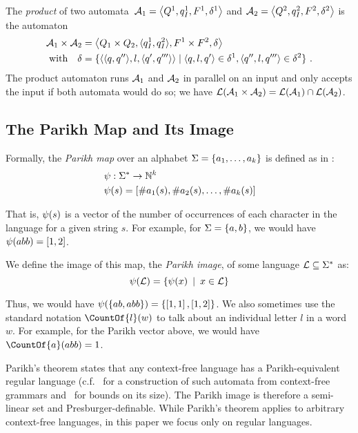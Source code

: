 The \emph{product} of two
automata~$\mathcal{A}_1 = \left\langle Q^1, q_I^1,
  F^1, \delta^1\right\rangle$ and
$\mathcal{A}_2 = \left\langle Q^2, q_I^2,
  F^2, \delta^2\right\rangle$ is the automaton
\begin{align*}
\mathcal{A}_1 \times \mathcal{A}_2 &=
\left\langle Q_1 \times Q_2, \langle q_I^1, q_I^2\rangle,
F^1 \times F^2,
  \delta\right\rangle\\
  \text{with}\quad \delta &= \{\langle\langle q,q''\rangle, l, \langle q',q'''\rangle\rangle \mid \langle q, l, q'\rangle \in \delta^1, \langle q'', l, q'''\rangle \in \delta^2\}~.
\end{align*}
The product automaton runs $\mathcal{A}_1$ and $\mathcal{A}_2$ in
parallel on an input and only accepts the input if both automata would
do so; we have $\operatorname{\mathcal{L}}(\mathcal{A}_1 \times \mathcal{A}_2) =
\operatorname{\mathcal{L}}(\mathcal{A}_1) \cap \operatorname{\mathcal{L}}(\mathcal{A}_2)$.

\subsection{The Parikh Map and Its Image}
Formally, the \textit{Parikh map} over an alphabet $\Sigma=
\left\{a_1, \ldots, a_k \right\}$ is defined as in \cite{kozen}:
$$
\begin{aligned}
& \operatorname{\psi}: \Sigma^* \rightarrow \mathbb{N}^k \\
& \operatorname{\psi}(s) = \left[{\#a_1(s), \#a_2(s), \ldots, \#a_k(s)}\right]
\end{aligned}
$$

That is, $\operatorname{\psi}(s)$ is a vector of the number of occurrences of each
character in the language for a given string $s$. For example, for  $\Sigma =
\left\{a, b\right\}$, we would have $\operatorname{\psi}(abb) = \left[{1, 2}\right]$.

We define the image of this map, the \textit{Parikh image}, of some
language $\operatorname{\mathcal{L}} \subseteq \Sigma^*$ as:
\[
\operatorname{\psi}(\operatorname{\mathcal{L}}) = \left\{\operatorname{\psi}(x) \:\mid\: x \in \operatorname{\mathcal{L}}\right\}
\]

Thus, we would have $\operatorname{\psi}(\left\{ab, abb\right\}) = \left\{\left[1,
1\right], \left[1, 2\right]\right\}$. We also sometimes use the standard
notation $\CountOf{l}(w)$ to talk about an individual letter $l$ in a word $w$. For
example, for the Parikh vector above, we would have $\CountOf{a}(abb) = 1$.

Parikh's theorem states that any context-free language has a Parikh-equivalent
regular language (c.f.~\cite{construction} for a construction of such automata
from context-free grammars and~\cite{bounds} for bounds on its size).
The Parikh image is therefore a semi-linear set and Presburger-definable.
%
While Parikh's theorem applies to arbitrary context-free languages, in this
paper we focus only on regular languages.

